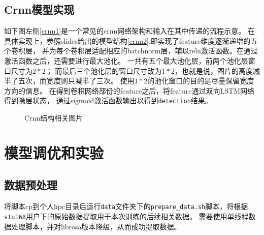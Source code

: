 \documentclass[]{ctexart}
\begin{document}
\subsection{Crnn模型实现}
如下图左侧\ref{crnn1}是一个常见的crnn网络架构和输入在其中传递的流程示意。
在具体实现上，参照slides给出的模型结构\ref{crnn2},即实现了feature维度逐渐递增的五个卷积层，
并为每个卷积层适配相应的batchnorm层，辅以relu激活函数。在通过激活函数之后，还需要进行最大池化。
一共有五个最大池化层，前两个池化层窗口尺寸为$2*2$；
而最后三个池化层的窗口尺寸改为$1*2$，也就是说，图片的高度减半了五次，而宽度则只减半了三次。
使用$1*2$的池化窗口的目的是尽量保留宽度方向的信息。
在得到卷积网络部份的feature之后，将feature通过双向LSTM网络得到隐层状态，
通过sigmoid激活函数输出以得到\texttt{detection}结果。
\begin{figure}[ht]
    \centering
    \caption{Crnn结构相关图片}
    \label{crnn}
\end{figure}

\newpage
\section{模型调优和实验}

\subsection{数据预处理}
将脚本cp到个人hpc目录后运行\texttt{data}文件夹下的\texttt{prepare\_data.sh}脚本，将根据\texttt{stu168}用户下的原始数据提取用于本次训练的后续相关数据。
需要使用单线程数据处理脚本，并对librosa版本降级，从而成功提取数据。
\end{document}

